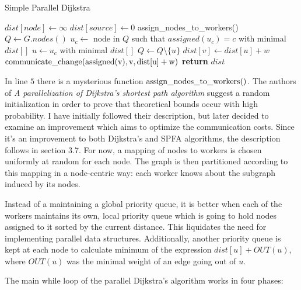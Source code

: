 \documentclass[12pt,a4paper,twoside,openright]{report}
\begin{document}
\begin{algorithm}
\caption{Simple Parallel Dijkstra}\label{pdijkstraagain}
\begin{algorithmic}[1]
    \State $dist[node] \gets \infty$
\EndFor
\State $dist[source] \gets 0$
\State \rm{assign\_nodes\_to\_workers()}
\State $Q \gets G.nodes()$
        \State $u_c \gets$ node in $Q$ such that $assigned(u_c) = c$ with minimal $dist[]$
        \EndFor
        \State $u \gets u_c$ with minimal $dist[]$
        \State $Q \gets Q \setminus \{u\}$
            \State $dist[v] \gets dist[u] + w$
            \State $\rm{communicate\_change(assigned(v)}, v, dist[u] + w)$
        \EndIf
      \EndFor
    \EndWhile
\State \textbf{return} $dist$
\EndProcedure
\end{algorithmic}
\end{algorithm}

In line $5$ there is a mysterious function $\rm{assign\_nodes\_to\_workers()}$. The authors of \textit{A parallelization of Dijkstra's shortest path algorithm} \cite{dijkstra} suggest a random initialization in order to prove that theoretical bounds occur with high probability. I have initially followed their description, but later decided to examine an improvement which aims to optimize the communication costs. Since it's an improvement to both Dijkstra's and SPFA algorithms, the description follows in section 3.7. For now, a mapping of nodes to workers is chosen uniformly at random for each node. The graph is then partitioned according to this mapping in a node-centric way: each worker knows about the subgraph induced by its nodes.

Instead of a maintaining a global priority queue, it is better when each of the workers maintains its own, local priority queue which is going to hold nodes assigned to it sorted by the current distance. This liquidates the need for implementing parallel data structures. Additionally, another priority queue is kept at each node to calculate minimum of the expression $dist[u] + OUT(u)$, where $OUT(u)$ was the minimal weight of an edge going out of $u$. 

The main while loop of the parallel Dijkstra's algorithm works in four phases:
\end{document}
